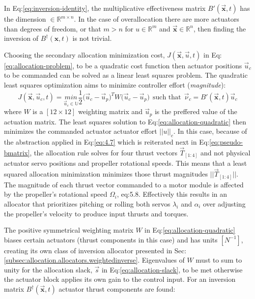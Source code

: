In Eq:\ref{eq:inversion-identity}, the multiplicative effectiveness matrix $B'(\vec{\mathbf{x}},t)$ has the dimension $\in\mathbb{R}^{m\times n}$. In the case of overallocation there are more actuators than degrees of freedom, or that $m>n$ for $u\in\mathbb{R}^{m}$ and $\vec{\mathbf{x}}\in\mathbb{R}^{n}$, then finding the inversion of $B^\dagger(\mathbf{x},t)$ is not trivial. 
\par
Choosing the secondary allocation minimization cost, $J(\vec{\mathbf{x}},\vec{u},t)$ in Eq:\ref{eq:allocation-problem}, to be a quadratic cost function then actuator positions $\vec{u}_c$ to be commanded can be solved as a linear least squares problem. The quadratic least squares optimization aims to minimize controller effort (\emph{magnitude}):
\begin{equation}\label{eq:allocation-quadratic}
J(\vec{\mathbf{x}},\vec{u}_c,t)=\underset{\vec{u}_c\in\mathbb{U}}{min}\frac{1}{2}\big(\vec{u}_c-\vec{u}_p\big)^TW\big(\vec{u}_c-\vec{u}_p)~~\text{such that}~~\vec{\nu}_c=B'(\vec{\mathbf{x}},t)\vec{u}_c
\end{equation}
where $W$ is a $[12\times 12]$ weighting matrix and $\vec{u}_p$ is the preffered value of the actuation matrix. The least squares solution \cite{matrixcomputations} to Eq:\ref{eq:allocation-quadratic} then minimizes the commanded actuator actuator effort $||u||_c$. In this case, because of the abstraction applied in Eq:\ref{eq:4.7} which is reiterated next in Eq:\ref{eq:pseudo-bmatrix}, the allocation rule solves for four thrust vectors $\vec{T}_{[1:4]}$ and not physical actuator servo positions and propeller rotational speeds. This means that a least squared allocation minimization minimizes those thrust magnitudes $||\vec{T}_{[1:4]}||$. The magnitude of each thrust vector commanded to a motor module is affected by the propeller's rotational speed $\Omega_i$, {eq:5.8}. Effectively this results in an allocator that prioritizes pitching or rolling both servos $\lambda_i$ and $\alpha_i$ over adjusting the propeller's velocity to produce input thrusts and torques. 
\par
The positive symmetrical weighting matrix $W$ in Eq:\ref{eq:allocation-quadratic} biases certain actuators (thrust components in this case) and has units $[N^{-1}]$, creating its own class of inversion allocator presented in Sec:\ref{subsec:allocation.allocators.weightedinverse}. Eigenvalues of $W$ must to sum to unity for the allocation slack, $\vec{s}$ in Eq:\ref{eq:allocation-slack}, to be met otherwise the actuator block applies its own gain to the control input. For an inversion matrix $B^\dagger(\vec{\mathbf{x}},t)$ actuator thrust components are found:
